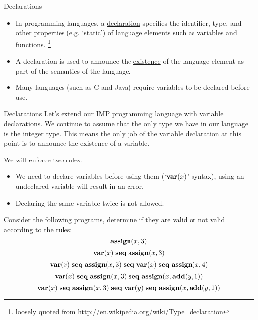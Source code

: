 \documentclass{beamer}
\begin{document}
\begin{frame}[fragile]{Declarations}
\begin{itemize}
\item
In programming languages, a \ul{declaration} specifies the identifier, type, and other properties (e.g. `static') of language elements such as variables and functions. \footnote{loosely quoted from http://en.wikipedia.org/wiki/Type\_declaration}


\item
A declaration is used to announce the \ul{existence} of the language element as part of the semantics of the language.  

\item
Many languages (such as C and Java) require variables to be declared before use.
\end{itemize}

\end{frame}

\begin{frame}[fragile]{Declarations}
\scriptsize
Let's extend  our IMP programming language with variable declarations.  We continue to assume that 
the only type we have in our language is the integer type.  This means the only job of the variable declaration
at this point is to announce the existence of a variable.

\vspace{.1in}

We will enforce two rules:
\begin{itemize}
\item  We need to declare variables before using them (`${\bf var}(x)$' syntax), using an undeclared variable
will result in an error.
\item Declaring the same variable twice is not allowed.
\end{itemize}

Consider the following programs, determine if they are valid or not valid according to the rules:
\[
{\bf assign}(x, 3)
\]
\[
{\bf var}(x) \; {\bf seq}\; {\bf assign}(x, 3)
\]
\[
{\bf var}(x) \; {\bf seq}\; {\bf assign}(x, 3) \; {\bf seq} \; {\bf var}(x) \; {\bf seq}\; {\bf assign}(x, 4)
\]
\[
{\bf var}(x) \; {\bf seq}\; {\bf assign}(x, 3) \; {\bf seq}\; {\bf assign}(x, {\bf add}(y,1))
\]
\[
{\bf var}(x) \; {\bf seq}\; {\bf assign}(x, 3) \; {\bf seq} \; {\bf var}(y) \; {\bf seq}\; {\bf assign}(x, {\bf add}(y,1))
\]
\end{frame}
\end{document}
